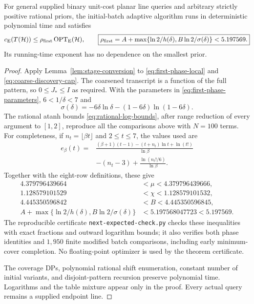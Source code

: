 \begin{theorem}
\label{thm:first-phase-expected}
For general supplied binary unit-cost planar line queries and arbitrary
strictly positive rational priors, the initial-batch adaptive algorithm
runs in deterministic polynomial time and satisfies
\[
 c_{\mathrm E}(T(\mathcal H))\le\rho_{\rm first}\operatorname{OPT}_{\mathrm E}(\mathcal H),
 \qquad
 \boxed{\rho_{\rm first}=
 A+\max\{\ln2/h(\delta),B\ln2/\sigma(\delta)\}<5.197569.}
\]
Its running-time exponent has no dependence on the smallest prior.
\end{theorem}
\begin{proof}
Apply Lemma~\ref{lem:stage-conversion} to
\eqref{eq:first-phase-local} and
\eqref{eq:coarse-discovery-cap}. The coarsened transcript is a
function of the full pattern, so $0\le J_*\le I$ as required.
With the parameters in \eqref{eq:first-phase-parameters},
$6<1/\delta<7$ and
\[
 \sigma(\delta)=-6\delta\ln\delta
               -(1-6\delta)\ln(1-6\delta).
\]
The rational atanh bounds \eqref{eq:rational-log-bounds}, after
range reduction of every argument to $[1,2]$, reproduce all the
comparisons above with $N=100$ terms. For completeness, if
$n_t=\lfloor\beta t\rfloor$ and $2\le t\le7$, the values used are
\[
 \begin{aligned}
 e_\beta(t)={}&
 \frac{(\beta+1)(t-1)-(t+n_t)\ln t+\ln(t!)}{\ln\beta}\\
 &-(n_t-3)+\frac{\ln(n_t!/6)}{\ln\beta}.
 \end{aligned}
\]
Together with the eight-row definitions, these give
\[
 \begin{aligned}
 4.379796439664&<\mu<4.379796439666,\\
 1.128579101529&<\chi<1.128579101532,\\
 4.445350596842&<B<4.445350596845,\\
 A+\max\{\ln2/h(\delta),B\ln2/\sigma(\delta)\}
 &<5.197568047723<5.197569.
 \end{aligned}
\]
The reproducible certificate \texttt{next-expected-check.py} checks
these inequalities with exact fractions and outward logarithm bounds;
it also verifies both phase identities and $1{,}950$ finite modified
batch comparisons, including early minimum-cover completion.
No floating-point optimizer is used by the theorem certificate.

The coverage DPs, polynomial rational shift enumeration, constant
number of initial variants, and disjoint-pattern recursion preserve
polynomial time. Logarithms and the table mixture appear only in the
proof. Every actual query remains a supplied endpoint line.
\end{proof}
